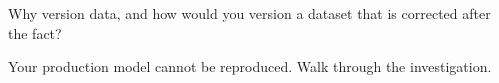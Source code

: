 \begin{interviewq}\label{iq:ml:experiment-tracking-and-reproducibility:5}
Why version data, and how would you version a dataset that is corrected after the fact?
\end{interviewq}

\begin{interviewq}\label{iq:ml:experiment-tracking-and-reproducibility:6}
Your production model cannot be reproduced. Walk through the investigation.
\end{interviewq}
